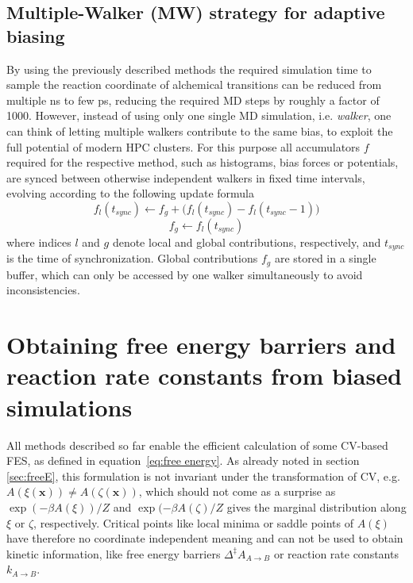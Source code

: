 \subsection{Multiple-Walker (MW) strategy for adaptive biasing}
\label{sec:MW}
By using the previously described methods the required simulation time to sample the reaction coordinate of alchemical transitions can be reduced from multiple ns to few ps, reducing the required MD steps by roughly a factor of 1000.
However, instead of using only one single MD simulation, i.e. \textit{walker}, one can think of letting multiple walkers contribute to the same bias, to exploit the full potential of modern HPC clusters.
For this purpose all accumulators $f$ required for the respective method, such as histograms, bias forces or potentials, are synced between otherwise independent walkers in fixed time intervals, evolving according to the following update formula
\begin{equation}
   f_{l}(t_{sync}) \leftarrow f_{g} + \biggl(f_{l}(t_{sync})-f_{l}(t_{sync}-1) \biggr)
\end{equation}
\begin{equation}
   f_{g} \leftarrow f_{l}(t_{sync})
\end{equation}
where indices $l$ and $g$ denote local and global contributions, respectively, and $t_{sync}$ is the time of synchronization.
Global contributions $f_{g}$ are stored in a single buffer, which can only be accessed by one walker simultaneously to avoid inconsistencies.



\section{Obtaining free energy barriers and reaction rate constants from biased simulations}
\label{sec:A_geom}
All methods described so far enable the efficient calculation of some CV-based FES, as defined in equation~\ref{eq:free energy}.
As already noted in section \ref{sec:freeE}, this formulation is not invariant under the transformation of CV, e.g. $A(\xi(\textbf{x}))\neq A(\zeta(\textbf{x}))$, which should not come as a surprise as $\exp(-\beta A(\xi))/Z$ and $\exp(-\beta A({\zeta})/Z$ gives the marginal distribution along $\xi$ or $\zeta$, respectively.
Critical points like local minima or saddle points of $A(\xi)$ have therefore no coordinate independent meaning and can not be used to obtain kinetic information, like free energy barriers $\Delta^\ddagger A_{A\rightarrow B}$ or reaction rate constants $k_{A\rightarrow B}$.\autocite{bal2020free}

